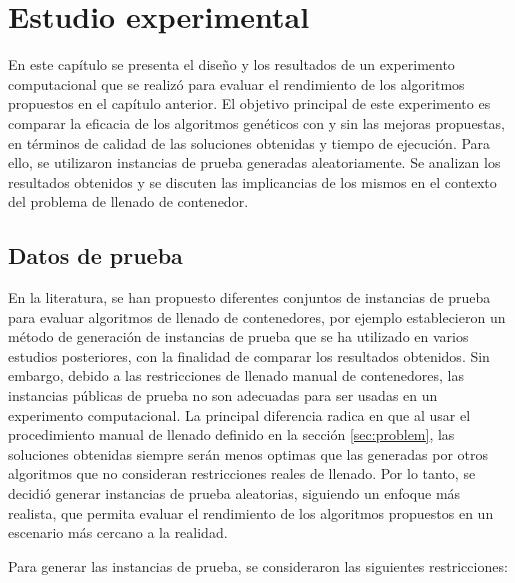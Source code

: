 \section{Estudio experimental}

En este capítulo se presenta el diseño y los resultados de un experimento computacional que se realizó para evaluar el rendimiento de los algoritmos propuestos en el capítulo anterior. El objetivo principal de este experimento es comparar la eficacia de los algoritmos genéticos con y sin las mejoras propuestas, en términos de calidad de las soluciones obtenidas y tiempo de ejecución. Para ello, se utilizaron instancias de prueba generadas aleatoriamente. Se analizan los resultados obtenidos y se discuten las implicancias de los mismos en el contexto del problema de llenado de contenedor.

\subsection{Datos de prueba}

En la literatura, se han propuesto diferentes conjuntos de instancias de prueba para evaluar algoritmos de llenado de contenedores, por ejemplo \textcite{BISCHOFF1995377} establecieron un método de generación de instancias de prueba que se ha utilizado en varios estudios posteriores, con la finalidad de comparar los resultados obtenidos. Sin embargo, debido a las restricciones de llenado manual de contenedores, las instancias públicas de prueba no son adecuadas para ser usadas en un experimento computacional. La principal diferencia radica en que al usar el procedimiento manual de llenado definido en la sección \ref{sec:problem}, las soluciones obtenidas siempre serán menos optimas que las generadas por otros algoritmos que no consideran restricciones reales de llenado. Por lo tanto, se decidió generar instancias de prueba aleatorias, siguiendo un enfoque más realista, que permita evaluar el rendimiento de los algoritmos propuestos en un escenario más cercano a la realidad.

Para generar las instancias de prueba, se consideraron las siguientes restricciones:

